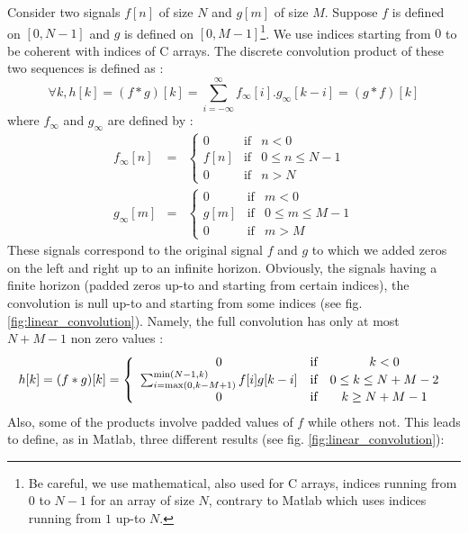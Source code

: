 \documentclass[a4paper,10pt,twoside]{article}
\begin{document}
Consider two signals $f[n]$ of size $N$ and $g[m]$ of size $M$. Suppose $f$ is defined on $[0,N-1]$ and $g$ is defined on $[0,M-1]$\footnote{Be careful, we use mathematical, also used for C arrays, indices running from $0$ to $N-1$ for an array of size $N$, contrary to Matlab which uses indices running from $1$ up-to $N$.}. We use indices starting from $0$ to be coherent with indices of C arrays. The discrete convolution product of these two sequences is defined as : 
\begin{equation}
\forall k, h[k] = (f * g)[k] = \sum_{i=-\infty}^{\infty} f_\infty[i] . g_\infty[k - i] = (g * f)[k]
\end{equation}
where $f_\infty$ and $g_\infty$ are defined by :
\begin{eqnarray}
\nonumber f_\infty[n] &=&
\left\lbrace
\begin{array}{ccc}
0     & \mbox{if} & n < 0\\
f[n]  & \mbox{if} & 0 \leq n \leq N-1\\
0     & \mbox{if} & n > N
\end{array}\right. \\
\nonumber g_\infty[m] &=&
\left\lbrace
\begin{array}{ccc}
0     & \mbox{if} & m < 0\\
g[m]  & \mbox{if} & 0 \leq m \leq M-1\\
0     & \mbox{if} & m > M
\end{array}\right.
\end{eqnarray}
These signals correspond to the original signal $f$ and $g$ to which we added zeros on the left and right up to an infinite horizon. Obviously, the signals having a finite horizon (padded zeros up-to and starting from certain indices), the convolution is null up-to and starting from some indices (see fig. \ref{fig:linear_convolution}). Namely, the full convolution has only at most $N+M-1$ non zero values :
\begin{equation}
h[k] = (f*g)[k] =
\left\lbrace
\begin{array}{ccc}
0     & \mbox{if} & k < 0\\
\sum_{i=\max(0,k-M+1)}^{\min(N-1,k)} f[i] g[k-i] & \mbox{if} & 0 \leq k \leq N+M-2\\
0     & \mbox{if} & k \geq N + M -1
\end{array}\right.\\
\end{equation}
Also, some of the products involve padded values of $f$ while others not. This leads to define, as in Matlab, three different results (see fig. \ref{fig:linear_convolution}):
\end{document}
